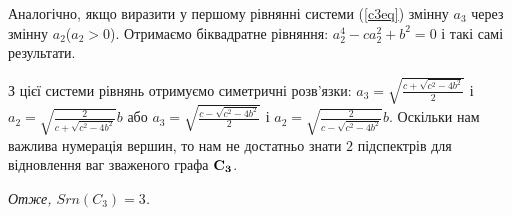 Аналогічно, якщо виразити у першому рівнянні системи (\ref{c3eq}) змінну $a_3$ через змінну $a_2$($a_2 > 0$). Отримаємо біквадратне рівняння: $ a_2^4 - c a_2^2 + b^2 = 0$ і такі самі результати.

 З цієї системи рівнянь отримуємо симетричні розв'язки: $a_3 =  \sqrt{\frac{c+\sqrt{c^2-4b^2}}{2}}$ і $a_2 = \sqrt{\frac{2}{c+\sqrt{c^2-4b^2}}}b$ або $a_3 =  \sqrt{\frac{c-\sqrt{c^2-4b^2}}{2}}$ і $a_2 = \sqrt{\frac{2}{c-\sqrt{c^2-4b^2}}}b$. Оскільки нам важлива нумерація вершин, то нам не достатньо знати $2$ підспектрів для відновлення ваг зваженого графа $\bf C_3$.
 
\textit{ Отже, $Srn(C_3) = 3$.}